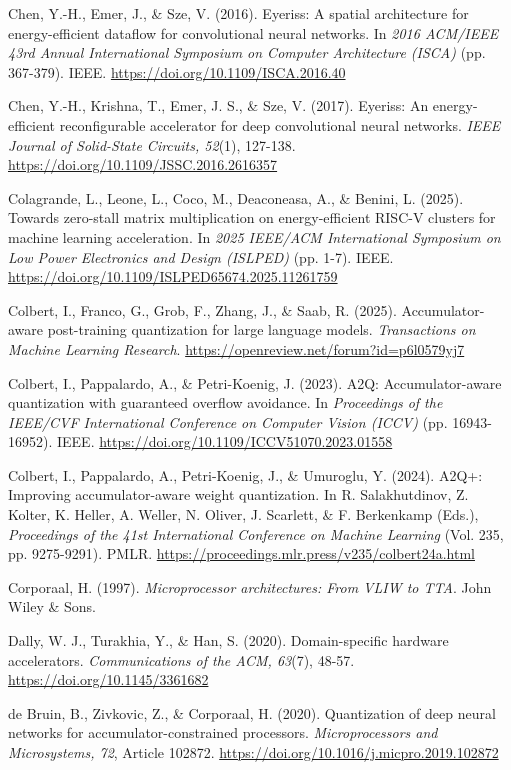 \begin{apareferences}
Chen, Y.-H., Emer, J., \& Sze, V. (2016). Eyeriss: A spatial architecture for energy-efficient dataflow for convolutional neural networks. In \emph{2016 ACM/IEEE 43rd Annual International Symposium on Computer Architecture (ISCA)} (pp. 367-379). IEEE. \url{https://doi.org/10.1109/ISCA.2016.40}

Chen, Y.-H., Krishna, T., Emer, J. S., \& Sze, V. (2017). Eyeriss: An energy-efficient reconfigurable accelerator for deep convolutional neural networks. \emph{IEEE Journal of Solid-State Circuits, 52}(1), 127-138. \url{https://doi.org/10.1109/JSSC.2016.2616357}

Colagrande, L., Leone, L., Coco, M., Deaconeasa, A., \& Benini, L. (2025). Towards zero-stall matrix multiplication on energy-efficient RISC-V clusters for machine learning acceleration. In \emph{2025 IEEE/ACM International Symposium on Low Power Electronics and Design (ISLPED)} (pp. 1-7). IEEE. \url{https://doi.org/10.1109/ISLPED65674.2025.11261759}

Colbert, I., Franco, G., Grob, F., Zhang, J., \& Saab, R. (2025). Accumulator-aware post-training quantization for large language models. \emph{Transactions on Machine Learning Research}. \url{https://openreview.net/forum?id=p6l0579yj7}

Colbert, I., Pappalardo, A., \& Petri-Koenig, J. (2023). A2Q: Accumulator-aware quantization with guaranteed overflow avoidance. In \emph{Proceedings of the IEEE/CVF International Conference on Computer Vision (ICCV)} (pp. 16943-16952). IEEE. \url{https://doi.org/10.1109/ICCV51070.2023.01558}

Colbert, I., Pappalardo, A., Petri-Koenig, J., \& Umuroglu, Y. (2024). A2Q+: Improving accumulator-aware weight quantization. In R. Salakhutdinov, Z. Kolter, K. Heller, A. Weller, N. Oliver, J. Scarlett, \& F. Berkenkamp (Eds.), \emph{Proceedings of the 41st International Conference on Machine Learning} (Vol. 235, pp. 9275-9291). PMLR. \url{https://proceedings.mlr.press/v235/colbert24a.html}

Corporaal, H. (1997). \emph{Microprocessor architectures: From VLIW to TTA}. John Wiley \& Sons.

Dally, W. J., Turakhia, Y., \& Han, S. (2020). Domain-specific hardware accelerators. \emph{Communications of the ACM, 63}(7), 48-57. \url{https://doi.org/10.1145/3361682}

de Bruin, B., Zivkovic, Z., \& Corporaal, H. (2020). Quantization of deep neural networks for accumulator-constrained processors. \emph{Microprocessors and Microsystems, 72}, Article 102872. \url{https://doi.org/10.1016/j.micpro.2019.102872}


\end{apareferences}
